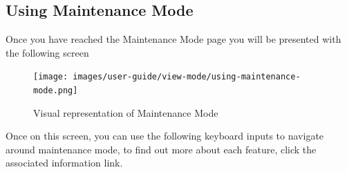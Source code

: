 \documentclass[
  english,
  a4paper,
,tablecaptionabove
]{scrartcl}
\begin{document}
\newpage

\hypertarget{using-maintenance-mode}{%
\subsection{Using Maintenance Mode}\label{using-maintenance-mode}}

Once you have reached the Maintenance Mode page you will be presented
with the following screen

\begin{figure}
\centering
\texttt{[image: images/user-guide/view-mode/using-maintenance-mode.png]}
\caption{Visual representation of Maintenance Mode}
\end{figure}

Once on this screen, you can use the following keyboard inputs to
navigate around maintenance mode, to find out more about each feature,
click the associated information link.
\end{document}
